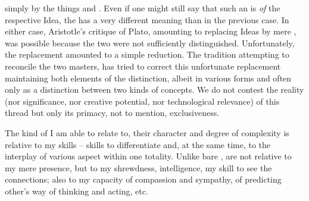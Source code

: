 simply  by the things and . Even if one might still
say that such an  is {\em of} the respective Idea, the
 has a very different meaning than in the previous case. In either case,
Aristotle's critique of Plato, amounting to replacing Ideas by mere
, was possible because the two were not sufficiently distinguished.
Unfortunately, the replacement amounted to a simple reduction. The tradition
attempting to reconcile the two masters, has tried to correct this unfortunate
replacement maintaining both elements of the distinction, albeit in various
forms and often only as a distinction between two kinds of
concepts.  We do not contest the reality (nor
significance, nor creative potential, nor technological relevance) of this
 thread but only its primacy, not to mention, exclusiveness.



\pa
The kind of  I am able to relate to, their character and degree of
complexity is relative to my skills -- skills to differentiate and, at the same
time, to  the interplay of various aspect within one totality.
Unlike bare ,  are not relative to my mere presence,
but to my shrewdness, intelligence, my skill to see the connections; also to my
capacity of compassion and sympathy, of predicting other's 
way of thinking and acting, etc.


